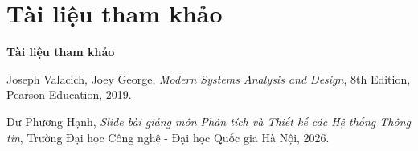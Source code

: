 \documentclass[12pt,a4paper]{report}
\begin{document}
\clearpage
\chapter*{Tài liệu tham khảo}

\textbf{Tài liệu tham khảo}

\begin{enumerate}[label={[\arabic*]}, leftmargin=1.5cm]

\item Joseph Valacich, Joey George, \textit{Modern Systems Analysis and Design}, 8th Edition, Pearson Education, 2019.

\item Dư Phương Hạnh, \textit{Slide bài giảng môn Phân tích và Thiết kế các Hệ thống Thông tin}, Trường Đại học Công nghệ - Đại học Quốc gia Hà Nội, 2026.

\end{enumerate}
\end{document}
